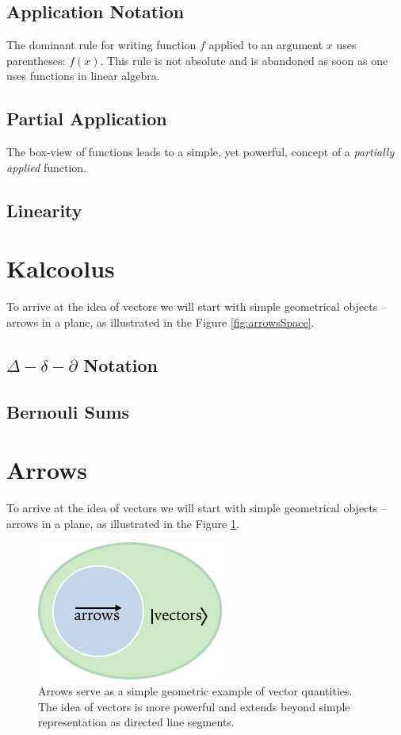 \subsection{Application Notation}
The dominant rule for writing function $f$ applied to an argument $x$ uses parentheses: $f(x)$. This rule is not absolute and is abandoned as soon as one uses functions in linear algebra.


\subsection{Partial Application}
The box-view of functions leads to a simple, yet powerful, concept of a \emph{partially applied} function.


\subsection{Linearity}

\section{Kalcoolus}

To arrive at the idea of vectors we will start with simple geometrical
objects -- arrows in a plane, as illustrated in the Figure \ref{fig:arrowsSpace}.

\subsection{$\Delta-\delta-\partial$ Notation}

\subsection{Bernouli Sums}

\section{Arrows}

To arrive at the idea of vectors we will start with simple geometrical
objects -- arrows in a plane, as illustrated in the Figure \ref{fig:arrowsAndVectors}.

\begin{figure}[htbp]
  \centering
  \includegraphics[scale=1.0]{arrowsAndVectors}
  \caption{Arrows serve as a simple geometric example of vector quantities. The idea of vectors is more powerful and extends beyond simple representation as directed line segments.}
  \label{fig:arrowsAndVectors}
\end{figure}

